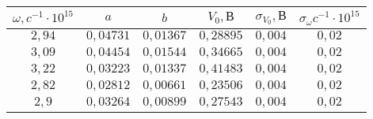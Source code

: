 \begin{tabular}{| c | c | c | c | c | c |}
\hline
$\omega, c^{-1} \cdot 10^{15}$ & $a$ & $b$ & $V_0, В$ & $\sigma_{V_0}, В$ & $\sigma_{\omega}  c^{-1} \cdot 10^{15}$\\
\hline
$2,94$ & $0,04731$ & $0,01367$ & $0,28895$ & $0,004$ & $0,02$\\
\hline
$3,09$ & $0,04454$ & $0,01544$ & $0,34665$ & $0,004$ & $0,02$\\
\hline
$3,22$ & $0,03223$ & $0,01337$ & $0,41483$ & $0,004$ & $0,02$\\
\hline
$2,82$ & $0,02812$ & $0,00661$ & $0,23506$ & $0,004$ & $0,02$\\
\hline
$2,9$ & $0,03264$ & $0,00899$ & $0,27543$ & $0,004$ & $0,02$\\
\hline
\end{tabular}
